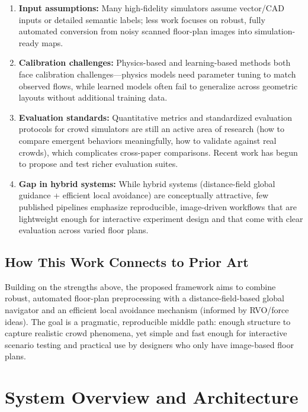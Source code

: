 \documentclass[conference]{IEEEtran}
\begin{document}
\begin{enumerate}
    \item \textbf{Input assumptions:} Many high-fidelity simulators assume vector/CAD inputs or detailed semantic labels; less work focuses on robust, fully automated conversion from noisy scanned floor-plan images into simulation-ready maps.

    \item \textbf{Calibration challenges:} Physics-based and learning-based methods both face calibration challenges—physics models need parameter tuning to match observed flows, while learned models often fail to generalize across geometric layouts without additional training data.

    \item \textbf{Evaluation standards:} Quantitative metrics and standardized evaluation protocols for crowd simulators are still an active area of research (how to compare emergent behaviors meaningfully, how to validate against real crowds), which complicates cross-paper comparisons. Recent work has begun to propose and test richer evaluation suites.

    \item \textbf{Gap in hybrid systems:} While hybrid systems (distance-field global guidance + efficient local avoidance) are conceptually attractive, few published pipelines emphasize reproducible, image-driven workflows that are lightweight enough for interactive experiment design and that come with clear evaluation across varied floor plans.
\end{enumerate}

\subsection{How This Work Connects to Prior Art}

Building on the strengths above, the proposed framework aims to combine robust,
automated floor-plan preprocessing with a distance-field-based global navigator
and an efficient local avoidance mechanism (informed by RVO/force ideas). The
goal is a pragmatic, reproducible middle path: enough structure to capture
realistic crowd phenomena, yet simple and fast enough for interactive scenario
testing and practical use by designers who only have image-based floor plans.

\section{System Overview and Architecture}
\end{document}
